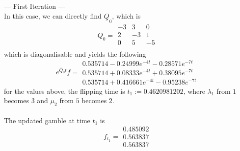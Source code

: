 \documentclass{article}
\begin{document}
--- First Iteration ---\\
In this case, we can directly find $\underline{Q}_{0}$, which is
\begin{equation*} 
 \overline{Q}_{0}= 
 \begin{array}{|rrr|}
  -3 & 3 & 0 \\
  2 & -3 & 1 \\
  0 & 5 & -5 \\
 \end{array}
 \end{equation*}
which is diagonalisable and yields the following
\begin{equation*} 
 e^{\overline{Q}_{0}t}f= 
 \begin{array}{|r|}
  0.535714-0.24999e^{-4t}-0.28571e^{-7t}\\
  0.535714+0.08333e^{-4t}+0.38095e^{-7t}\\
  0.535714+0.416661e^{-4t}-0.95238e^{-7t}
 \end{array}
 \end{equation*}
for the values above, the flipping time is $t_{1}:= 0.4620981202$, where $\lambda_{1}$ from $1$ becomes $3$ and $\mu_{2}$ from $5$ becomes $2$.\\\\
The updated gamble at time $t_{1}$ is
\begin{equation*}  
 f_{t_1}= 
 \begin{array}{|c|}
  0.485092\\
  0.563837\\
  0.563837
 \end{array}
 \end{equation*}\\\\
\end{document}
